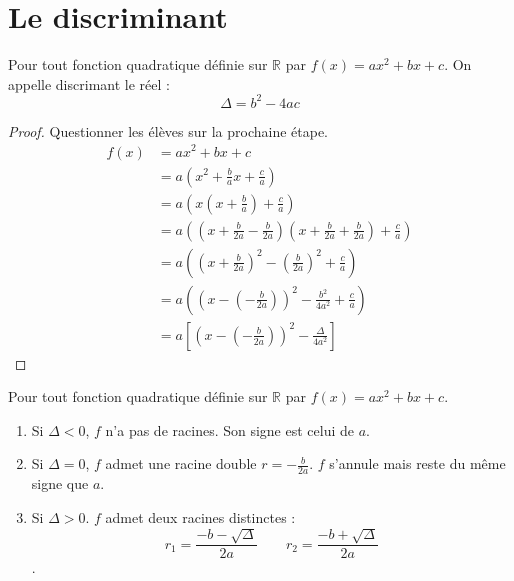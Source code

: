 \documentclass[main.tex]{subfiles}
\begin{document}
 \section{Le discriminant} 
 \begin{definition} Pour tout fonction quadratique définie sur $\mathbb{R}$ par $f(x)=ax^2+bx+c$. On appelle discrimant le réel   :
 	\setlength{\abovedisplayskip}{3pt}
 	\setlength{\belowdisplayskip}{3pt}
 	$$
 	\Delta = b^2- 4ac
 	$$
 \end{definition}
 \begin{proof}Questionner les élèves sur la prochaine étape.
 	\begin{align*}
 		f(x)& = ax^2 + bx +c \\
 		& = a \left( x^2 + \frac{b}{a} x + \frac{c}{a}\right)\\
 		& = a\left( x \left( x + \frac{b}{a}\right) + \frac{c}{a}\right) \\
 		& = a\left( \left( x + \frac{b}{2a} -\frac{b}{2a} \right)\left( x + \frac{b}{2a} +\frac{b}{2a} \right) +\frac{c}{a}\right) \\
 		& = a\left(\left( x + \frac{b}{2a}  \right)^2-\left(\frac{b}{2a}\right)^2 + \frac{c}{a} \right) \\
 		& = a\left(  \left( x -  \left(-\frac{b}{2a}\right) \right)^2 -  \frac{b^2}{4a^2}  + \frac{c}{a} \right)  \\
 		& = a  \left[ \left( x -   \left(-\frac{b}{2a}\right) \right)^2 -  \frac{\Delta}{4a^2} \right] %
 	\end{align*}
 \end{proof}
 \begin{theorem} Pour tout fonction quadratique définie sur $\mathbb{R}$ par $f(x)=ax^2+bx+c$.
 	\begin{enumerate}[label=\textbullet, leftmargin=*]
 		\item Si $\Delta<0$, $f$ n'a pas de racines. Son signe est celui de $a$.
 		\item Si $\Delta=0$, $f$ admet une racine double $r=-\frac{b}{2a}$. $f$ s'annule mais reste du même signe que $a$.
 		\item Si $\Delta>0$. $f$ admet deux racines distinctes :
 		\setlength{\abovedisplayskip}{3pt}
 		\setlength{\belowdisplayskip}{3pt}
 		$$
 		r_1 = \frac{-b-\sqrt{\Delta}}{2a}\qquad  r_2 = \frac{-b+\sqrt{\Delta}}{2a}
 		$$.
 	\end{enumerate}  
 \end{theorem}  
\end{document}
